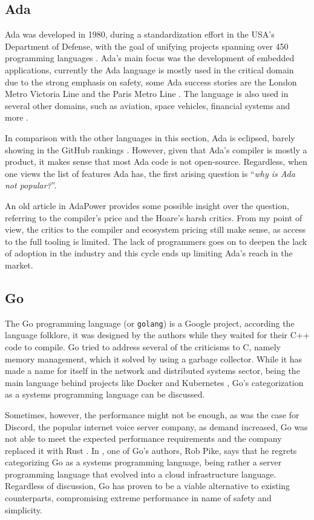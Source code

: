 \subsection{Ada}

Ada was developed in 1980, during a standardization effort in the USA's Department of Defense,
with the goal of unifying projects spanning over 450 programming languages \autocite{Ada2021}.
Ada's main focus was the development of embedded applications,
currently the Ada language is mostly used in the critical domain due to the strong emphasis on safety,
some Ada success stories are the London Metro Victoria Line and the Paris Metro Line \autocite{SIGAda2021}.
The language is also used in several other domains, such as aviation, space vehicles, financial systems and more \autocite{Feldman2014}.

In comparison with the other languages in this section, Ada is eclipsed, barely showing in the GitHub rankings \autocite{Palmer2021}.
However, given that Ada's compiler is mostly a product, it makes sense that most Ada code is not open-source.
Regardless, when one views the list of features Ada has, the first arising question is “\emph{why is Ada not popular?}”.

An old article in AdaPower \autocite{Heaney1998} provides some possible insight over the question,
referring to the compiler's price and the Hoare's harsh critics.
From my point of view, the critics to the compiler and ecosystem pricing still make sense,
as access to the full tooling is limited.
The lack of programmers goes on to deepen the lack of adoption in the industry
and this cycle ends up limiting Ada's reach in the market.

\subsection{Go}

The Go programming language (or \texttt{golang}) is a Google project,
according the language folklore, it was designed by the authors while they waited for their C++ code to compile.
Go tried to address several of the criticisms to C, namely memory management,
which it solved by using a garbage collector.
While it has made a name for itself in the network and distributed systems sector,
being the main language behind projects like Docker \autocite{Docker2021} and Kubernetes \autocite{Kubernetes2021},
Go's categorization as a systems programming language can be discussed.

Sometimes, however, the performance might not be enough,
as was the case for Discord, the popular internet voice server company, as demand increased,
Go was not able to meet the expected performance requirements and the company replaced it with Rust \autocite{Howarth2020}.
In \autocite{Torre2014}, one of Go's authors, Rob Pike, says that he regrets categorizing Go as a systems programming language,
being rather a server programming language that evolved into a cloud infrastructure language.
Regardless of discussion, Go has proven to be a viable alternative to existing counterparts,
compromising extreme performance in name of safety and simplicity.

